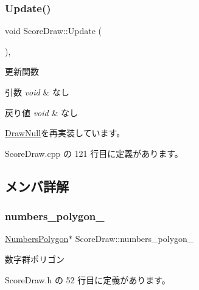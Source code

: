 \subsubsection{\texorpdfstring{Update()}{Update()}}
{\footnotesize\ttfamily void Score\+Draw\+::\+Update (\begin{DoxyParamCaption}{ }\end{DoxyParamCaption})\hspace{0.3cm}{\ttfamily [override]}, {\ttfamily [virtual]}}



更新関数 


\begin{DoxyParams}{引数}
{\em void} & なし \\
\hline
\end{DoxyParams}

\begin{DoxyRetVals}{戻り値}
{\em void} & なし \\
\hline
\end{DoxyRetVals}


\mbox{\hyperlink{class_draw_null_ad32a508d269de7eda8ad24ea72230464}{Draw\+Null}}を再実装しています。



 Score\+Draw.\+cpp の 121 行目に定義があります。



\subsection{メンバ詳解}
\mbox{\label{class_score_draw_a482c9c3229fe705952efb6521b93220b}} 
\subsubsection{\texorpdfstring{numbers\+\_\+polygon\+\_\+}{numbers\_polygon\_}}
{\footnotesize\ttfamily \mbox{\hyperlink{class_numbers_polygon}{Numbers\+Polygon}}$\ast$ Score\+Draw\+::numbers\+\_\+polygon\+\_\+\hspace{0.3cm}{\ttfamily [private]}}



数字群ポリゴン 



 Score\+Draw.\+h の 52 行目に定義があります。

